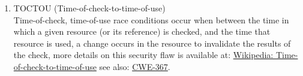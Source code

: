 \begin{enumerate}
         \item TOCTOU (Time-of-check-to-time-of-use) \\
               Time-of-check, time-of-use race conditions occur when between the time in
               which a given resource (or its reference) is checked, and the time that
               resource is used, a change occurs in the resource to invalidate the results
               of the check, more details on this security flaw is available at:
               \href{http://en.wikipedia.org/wiki/Time-of-check-to-time-of-use}{Wikipedia: Time-of-check-to-time-of-use}
               see also:
               \href{http://cwe.mitre.org/data/definitions/367.html}{CWE-367}.

      \end{enumerate}

